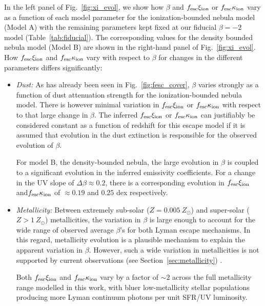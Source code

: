 In the left panel of Fig.~\ref{fig:xi_evol}, we show how $\beta$ and $f_{\rm{esc}}\xi_{\rm{ion}}$ or $f_{\rm{esc}}\kappa_{\rm{ion}}$ vary as a function of each model parameter for the ionization-bounded nebula model (Model A) with the remaining parameters kept fixed at our fiducial $\beta = -2$ model (Table~\ref{tab:fiducial}). The corresponding values for the density bounded nebula model (Model B) are shown in the right-hand panel of Fig.~\ref{fig:xi_evol}. How $f_{\rm{esc}}\xi_{\rm{ion}}$ and $f_{\rm{esc}}\kappa_{\rm{ion}}$ vary with respect to $\beta$ for changes in the different parameters differs significantly:

\begin{itemize}
    \item \emph{Dust:} As has already been seen in Fig.~\ref{fig:fesc_cover}, $\beta$ varies strongly as a function of dust attenuation strength for the ionization-bounded nebula model. There is however minimal variation in $f_{\rm{esc}}\xi_{\rm{ion}}$ or $f_{\rm{esc}}\kappa_{\rm{ion}}$ with respect to that large change in $\beta$. The inferred $f_{\rm{esc}}\xi_{\rm{ion}}$ or $f_{\rm{esc}}\kappa_{\rm{ion}}$ can justifiably be considered constant as a function of redshift for this escape model if it is assumed that evolution in the dust extinction is responsible for the observed evolution of $\beta$.
    
    For model B, the density-bounded nebula, the large evolution in $\beta$ is coupled to a significant evolution in the inferred emissivity coefficients. For a change in the UV slope of $\Delta\beta \approx 0.2$, there is a corresponding evolution in $f_{\rm{esc}}\xi_{\rm{ion}}$ and$f_{\rm{esc}}\kappa_{\rm{ion}}$ of $\approx 0.19$ and $0.25$ dex respectively.
        
    \item \emph{Metallicity:} Between extremely sub-solar ($Z=0.005~Z_{\odot}$) and super-solar ($Z>1~Z_{\odot}$) metallicities, the variation in $\beta$ is large enough to account for the wide range of observed average $\beta$'s for both Lyman escape mechanisms. In this regard, metallicity evolution is a plausible mechanism to explain the apparent variation in $\beta$. However, such a wide variation in metallicities is not supported by current observations (see Section~\ref{sec:metallicity}) .
    
    Both $f_{\rm{esc}}\xi_{\rm{ion}}$ and $f_{\rm{esc}}\kappa_{\rm{ion}}$ vary by a factor of $\sim2$ across the full metallicity range modelled in this work, with bluer low-metallicity stellar populations producing more Lyman continuum photons per unit SFR/UV luminosity.
    

\end{itemize}
